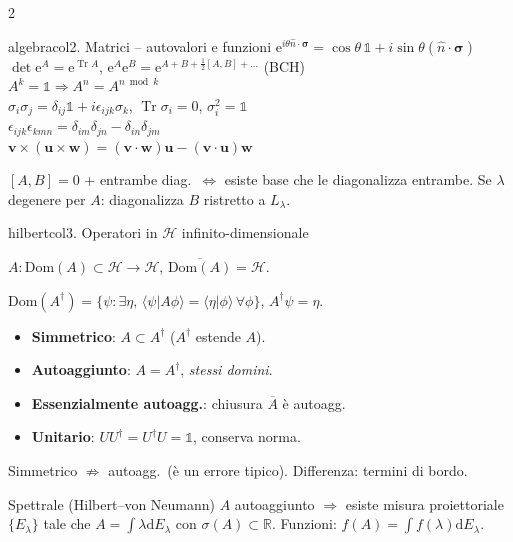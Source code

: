\documentclass[10pt,a4paper]{article}
\newcommand{\R}{\mathbb{R}}
\newcommand{\dd}{\mathrm{d}}
\newcommand{\eu}{\mathrm{e}}
\DeclareMathOperator{\Tr}{Tr}
\newcommand{\braket}[2]{\langle#1|#2\rangle}
\begin{document}
\begin{multicols}{2}
\begin{secbox}{algebracol}{2. Matrici -- autovalori e funzioni}
$\eu^{i\theta\hat n\cdot\bm\sigma}=\cos\theta\,\mathbb 1+i\sin\theta(\hat n\!\cdot\!\bm\sigma)$\\
$\det\eu^A=\eu^{\Tr A}$, $\eu^A\eu^B=\eu^{A+B+\frac{1}{2}[A,B]+\dots}$ (BCH)\\
$A^k=\mathbb 1\Rightarrow A^n=A^{n\bmod k}$\\
$\sigma_i\sigma_j=\delta_{ij}\mathbb 1+i\epsilon_{ijk}\sigma_k$, $\Tr\sigma_i=0$, $\sigma_i^2=\mathbb 1$\\
$\epsilon_{ijk}\epsilon_{kmn}=\delta_{im}\delta_{jn}-\delta_{in}\delta_{jm}$\\
$\bm v\!\times\!(\bm u\!\times\!\bm w)=(\bm v\!\cdot\!\bm w)\bm u-(\bm v\!\cdot\!\bm u)\bm w$

$[A,B]=0$ + entrambe diag.\ $\iff$ esiste base che le diagonalizza entrambe. Se $\lambda$ degenere per $A$: diagonalizza $B$ ristretto a $L_\lambda$.

\end{secbox}

\begin{secbox}{hilbertcol}{3. Operatori in $\mathcal H$ infinito-dimensionale}

$A:\mathrm{Dom}(A)\subset\mathcal H\to\mathcal H$, $\overline{\mathrm{Dom}(A)}=\mathcal H$.

$\mathrm{Dom}(A^\dagger)=\{\psi:\exists\eta,\,\braket{\psi}{A\phi}=\braket{\eta}{\phi}\,\forall\phi\}$, $A^\dagger\psi=\eta$.

\begin{itemize}
\item \textbf{Simmetrico}: $A\subset A^\dagger$ ($A^\dagger$ estende $A$).
\item \textbf{Autoaggiunto}: $A=A^\dagger$, \emph{stessi domini}.
\item \textbf{Essenzialmente autoagg.}: chiusura $\overline A$ è autoagg.
\item \textbf{Unitario}: $UU^\dagger=U^\dagger U=\mathbb 1$, conserva norma.
\end{itemize}
Simmetrico $\not\Rightarrow$ autoagg.\ (è un errore tipico). Differenza: termini di bordo.

\begin{teobox}{Spettrale (Hilbert--von Neumann)}
$A$ autoaggiunto $\Rightarrow$ esiste misura proiettoriale $\{E_\lambda\}$ tale che $A=\int\lambda\dd E_\lambda$ con $\sigma(A)\subset\R$. Funzioni: $f(A)=\int f(\lambda)\dd E_\lambda$.
\end{teobox}


\end{secbox}
\end{multicols}
\end{document}
